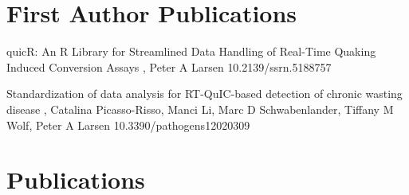 \documentclass{resume}
\begin{document}
    \section{First Author Publications}
        \begin{samepage}
            {quicR: An R Library for Streamlined Data Handling of Real-Time Quaking Induced Conversion Assays}
            {\me, Peter A Larsen}
            {10.2139/ssrn.5188757}

            {Standardization of data analysis for RT-QuIC-based detection of chronic wasting disease}
            {\me, Catalina Picasso-Risso, Manci Li, Marc D Schwabenlander, Tiffany M Wolf, Peter A Larsen}
            {10.3390/pathogens12020309}
        \end{samepage}


    \section{Publications}
\end{document}
